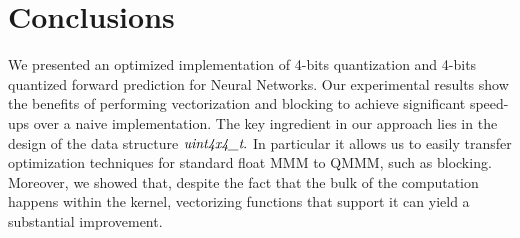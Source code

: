 \section{Conclusions}
We presented an optimized implementation of 4-bits quantization and 4-bits quantized forward prediction for Neural Networks. Our experimental results show the benefits of performing vectorization and blocking to achieve significant speed-ups over a naive implementation. The key ingredient in our approach lies in the design of the data structure $\emph{uint4x4\_t}.$ In particular it allows us to easily transfer optimization techniques for standard float MMM to QMMM, such as blocking.
Moreover, we showed that, despite the fact that the bulk of the computation happens within the kernel, vectorizing functions that support it can yield a substantial improvement.


